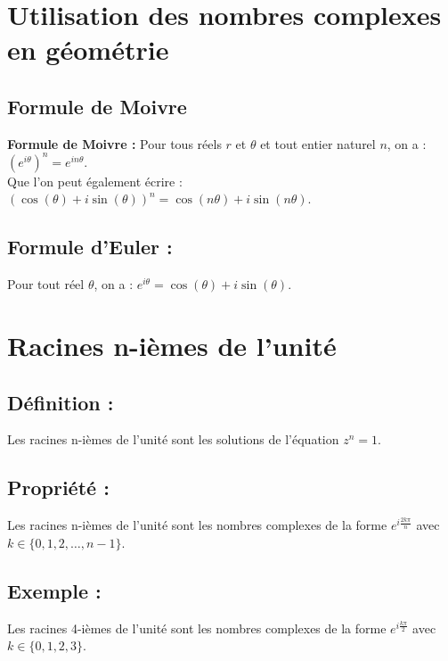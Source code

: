 \documentclass[a4paper,12pt]{article}
\begin{document}
    \section{Utilisation des nombres complexes en géométrie}
    \subsection{Formule de Moivre}
    \textbf{Formule de Moivre :} Pour tous réels $r$ et $\theta$ et tout entier naturel $n$, on a : $(e^{i\theta})^n = e^{in\theta}$. \\ Que l'on peut également écrire : $(\cos(\theta) + i\sin(\theta))^n = \cos(n\theta) + i\sin(n\theta)$.
    \subsection{Formule d'Euler :} Pour tout réel $\theta$, on a : $e^{i\theta} = \cos(\theta) + i\sin(\theta)$.

    \section{Racines n-ièmes de l'unité}
    \subsection{Définition :} Les racines n-ièmes de l'unité sont les solutions de l'équation $z^n = 1$.
    \subsection{Propriété :} Les racines n-ièmes de l'unité sont les nombres complexes de la forme $e^{i\frac{2k\pi}{n}}$ avec $k \in \{0, 1, 2, \ldots, n-1\}$.
    \subsection{Exemple :} Les racines 4-ièmes de l'unité sont les nombres complexes de la forme $e^{i\frac{k\pi}{2}}$ avec $k \in \{0, 1, 2, 3\}$.
\end{document}
